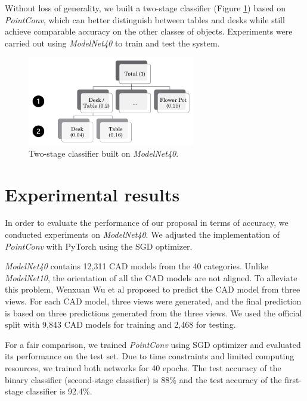 \documentclass{article}
\begin{document}
Without loss of generality, we built a two-stage classifier (Figure \ref{classifier}) based on \textit{PointConv}\cite{pointconv}, which can better distinguish between tables and desks while still achieve comparable accuracy on the other classes of objects. Experiments were carried out using \textit{ModelNet40}\cite{modelnet} to train and test the system.

\begin{figure}[h]
  \caption{Two-stage classifier built on \textit{ModelNet40}.}
  \label{classifier}
  \centering
  \includegraphics[width=0.65\textwidth]{classifier.png}
\end{figure}

\section{Experimental results}

In order to evaluate the performance of our proposal in terms of accuracy, we conducted experiments on \textit{ModelNet40}. We adjusted the implementation of \textit{PointConv}\cite{pointconv} with PyTorch using the SGD optimizer. 

\textit{ModelNet40} contains 12,311 CAD models from the 40 categories. Unlike \textit{ModelNet10}, the orientation of all the CAD models are not aligned. To alleviate this problem, Wenxuan Wu et al \cite{pointconv} proposed to predict the CAD model from three views. For each CAD model, three views were generated, and the final prediction is based on three predictions generated from the three views. We used the official split with 9,843 CAD models for training and 2,468 for testing.

For a fair comparison, we trained \textit{PointConv} using SGD optimizer and evaluated its performance on the test set. Due to time constraints and limited computing resources, we trained both networks for 40 epochs. The test accuracy of the binary classifier (second-stage classifier) is 88\% and the test accuracy of the first-stage classifier is 92.4\%. 
\end{document}
